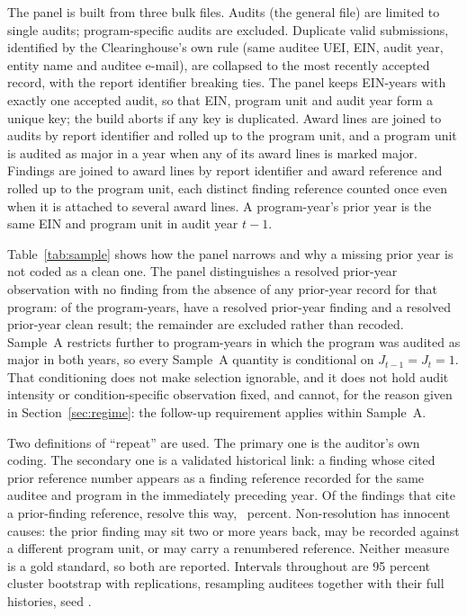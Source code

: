 The panel is built from three bulk files. Audits (the general file) are
limited to single audits; program-specific audits are excluded. Duplicate
valid submissions, identified by the Clearinghouse's own rule (same auditee
UEI, EIN, audit year, entity name and auditee e-mail), are collapsed to the
most recently accepted record, with the report identifier breaking ties. The
panel keeps EIN-years with exactly one accepted audit, so that EIN, program
unit and audit year form a unique key; the build aborts if any key is
duplicated. Award lines are joined to audits by report identifier and rolled
up to the program unit, and a program unit is audited as major in a year when
any of its award lines is marked major. Findings are joined to award lines by
report identifier and award reference and rolled up to the program unit, each
distinct finding reference counted once even when it is attached to several
award lines. A program-year's prior year is the same EIN and program unit in
audit year $t-1$.

Table~\ref{tab:sample} shows how the panel narrows and why a missing prior
year is not coded as a clean one. The panel distinguishes a resolved
prior-year observation with no finding from the absence of any prior-year
record for that program: of the \nPanelRows{} program-years, \nSone{} have a
resolved prior-year finding and \nStwo{} a resolved prior-year clean result;
the remainder are excluded rather than recoded. Sample~A restricts further to
program-years in which the program was audited as major in both years, so
every Sample~A quantity is conditional on $J_{t-1} = J_t = 1$. That
conditioning does not make selection ignorable, and it does not hold audit
intensity or condition-specific observation fixed, and cannot, for the reason
given in Section~\ref{sec:regime}: the follow-up requirement applies within
Sample~A.

Two definitions of ``repeat'' are used. The primary one is the auditor's own
coding. The secondary one is a validated historical link: a finding whose
cited prior reference number appears as a finding reference recorded for the
same auditee and program in the immediately preceding year. Of the
\nLinkFlagged{} findings that cite a prior-finding reference, \nLinkResolved{}
resolve this way, \nLinkPctRev{}~percent. Non-resolution has innocent causes: the
prior finding may sit two or more years back, may be recorded against a
different program unit, or may carry a renumbered reference. Neither measure
is a gold standard, so both are reported. Intervals throughout are 95 percent
cluster bootstrap with \nBootReps{} replications, resampling \nNAuditees{}
auditees together with their full histories, seed \nBootSeed{}.

